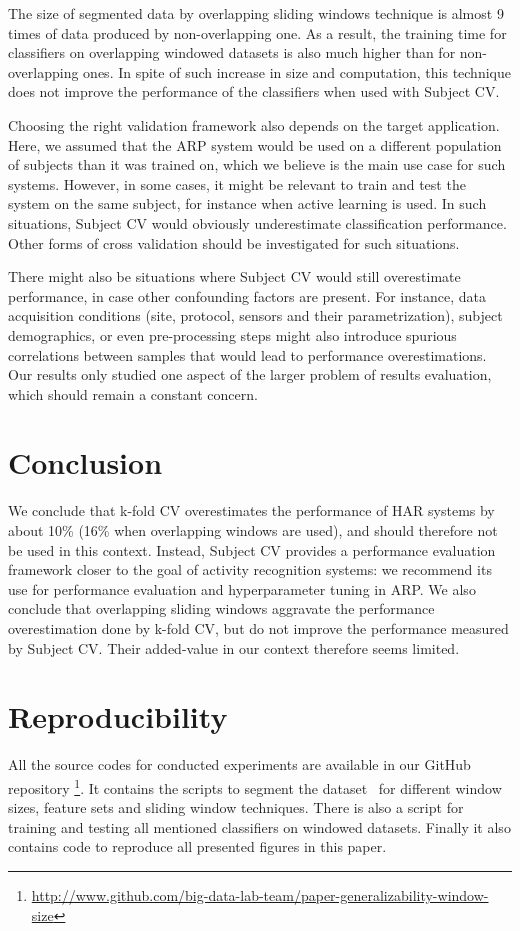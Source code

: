\documentclass[sigconf]{acmart}
\begin{document}
The size of segmented data by overlapping sliding windows technique is almost 9 times of data produced by non-overlapping one. As a result, the training time for classifiers on overlapping windowed datasets is also much higher than for non-overlapping ones. In spite of such increase in size and computation, this technique does not improve the performance of the classifiers when used with Subject CV. 

Choosing the right validation framework also depends on the target 
application. Here, we assumed that the ARP system would be used on a 
different population of subjects than it was trained on, which we believe
is the main use case for such systems. However, in some cases, it might
be relevant to train and test the system on the same subject, for instance
when active learning is used. In such situations, Subject CV would
obviously underestimate classification performance. Other forms of cross validation should be investigated for such situations. 

There might also be situations where Subject CV would still 
overestimate performance, in case other confounding factors are present.
For instance, data acquisition conditions (site, protocol, sensors and 
their parametrization), subject demographics, or even pre-processing 
steps might also introduce spurious correlations between samples that 
would lead to performance overestimations. Our results only studied one 
aspect of the larger problem of results evaluation, which should remain 
a constant concern.

\section{Conclusion} \label{sec:conclusion}

We conclude that k-fold CV overestimates the performance of HAR systems by about 10\% (16\% when overlapping windows are used), and should therefore not be used in this context. Instead, Subject CV provides a performance evaluation framework closer to the goal of activity recognition systems: we recommend its use for performance evaluation and hyperparameter tuning in ARP. We also conclude that overlapping sliding windows aggravate the performance overestimation done by k-fold CV, but do not improve the performance measured by Subject CV. Their added-value in our context therefore seems limited.  
\section{Reproducibility} 
All the source codes for conducted experiments are available in our GitHub repository \footnote{\url{http://www.github.com/big-data-lab-team/paper-generalizability-window-size}}. It contains the scripts to segment the dataset~\cite{banos2012benchmark} for different window sizes, feature sets and sliding window techniques. There is also a script for training and testing all mentioned classifiers on windowed datasets. Finally it also contains code to reproduce all presented figures in this paper.
\end{document}

